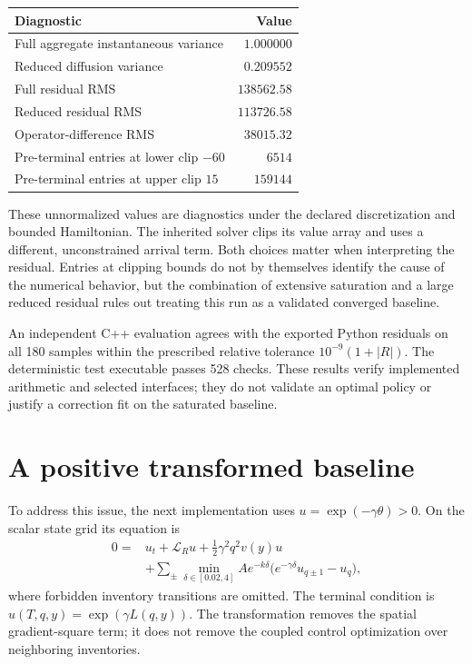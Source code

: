 \begin{center}
\begin{tabular}{@{}lr@{}}
\toprule
Diagnostic & Value \\
\midrule
Full aggregate instantaneous variance & $1.000000$ \\
Reduced diffusion variance & $0.209552$ \\
Full residual RMS & $138562.58$ \\
Reduced residual RMS & $113726.58$ \\
Operator-difference RMS & $38015.32$ \\
Pre-terminal entries at lower clip $-60$ & $6514$ \\
Pre-terminal entries at upper clip $15$ & $159144$ \\
\bottomrule
\end{tabular}
\end{center}

These unnormalized values are diagnostics under the declared discretization and bounded Hamiltonian. The inherited solver clips its value array and uses a different, unconstrained arrival term. Both choices matter when interpreting the residual. Entries at clipping bounds do not by themselves identify the cause of the numerical behavior, but the combination of extensive saturation and a large reduced residual rules out treating this run as a validated converged baseline.

An independent C++ evaluation agrees with the exported Python residuals on all 180 samples within the prescribed relative tolerance $10^{-9}(1+|R|)$. The deterministic test executable passes 528 checks. These results verify implemented arithmetic and selected interfaces; they do not validate an optimal policy or justify a correction fit on the saturated baseline.

\section{A positive transformed baseline}
To address this issue, the next implementation uses $u=\exp(-\gamma\theta)>0$. On the scalar state grid its equation is
\begin{align*}
0={}&u_t+\mathcal L_Ru+\tfrac12\gamma^2q^2v(y)u\\
 &+\sum_{\pm}\min_{\delta\in[0.02,4]}
 Ae^{-k\delta}\bigl(e^{-\gamma\delta}u_{q\pm1}-u_q\bigr),
\end{align*}
where forbidden inventory transitions are omitted. The terminal condition is $u(T,q,y)=\exp(\gamma L(q,y))$. The transformation removes the spatial gradient-square term; it does not remove the coupled control optimization over neighboring inventories.

